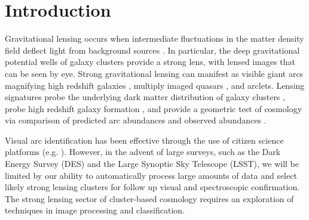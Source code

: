 \documentclass{emulateapj}
\begin{document}
\section{Introduction}

Gravitational lensing occurs when intermediate fluctuations in the
matter density field deflect light from background sources
\citep[see][for a review]{kneibandnatarajan_11}.  In particular, the
deep gravitational potential wells of galaxy clusters provide a strong
lens, with lensed images that can be seen by eye.  Strong
gravitational lensing can manifest as visible giant arcs magnifying
high redshift galaxies \citep{lyndsandpetrosian_86,gladders_etal03},
multiply imaged quasars \citep{walsh_etal79}, and arclets.  Lensing
signatures probe the underlying dark matter distribution of galaxy
clusters \citep{warrenanddye_03}, probe high redshift galaxy formation
\citep{allam_etal07}, and provide a geometric test of cosmology via
comparison of predicted arc abundances and observed abundances
\citep{kochanek_96,chae_03,linder_04}.

Visual arc identification has been effective through the use of
citizen science platforms (e.g. \citet{marshall_etal16,more_etal16}).
However, in the advent of large surveys, such as the Dark Energy
Survey (DES) and the Large Synoptic Sky Telescope (LSST), we will be
limited by our ability to automatically process large amounts of data
and select likely strong lensing clusters for follow up visual and
spectroscopic confirmation.  The strong lensing sector of
cluster-based cosmology requires an exploration of techniques in image
processing and classification.
\end{document}
